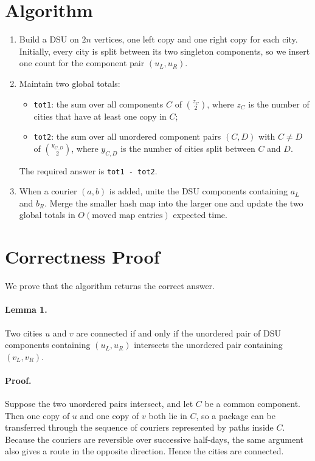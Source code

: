 \documentclass[11pt]{article}
\begin{document}
\section*{Algorithm}

\begin{enumerate}[leftmargin=*]
    \item Build a DSU on $2n$ vertices, one left copy and one right copy for each city.
    Initially, every city is split between its two singleton components, so we insert one count for the
    component pair $(u_L,u_R)$.
    \item Maintain two global totals:
    \begin{itemize}[leftmargin=*]
        \item \texttt{tot1}: the sum over all components $C$ of
        $\binom{z_C}{2}$, where $z_C$ is the number of cities that have at least one copy in $C$;
        \item \texttt{tot2}: the sum over all unordered component pairs $(C,D)$ with $C \ne D$ of
        $\binom{y_{C,D}}{2}$, where $y_{C,D}$ is the number of cities split between $C$ and $D$.
    \end{itemize}
    The required answer is \texttt{tot1 - tot2}.
    \item When a courier $(a,b)$ is added, unite the DSU components containing $a_L$ and $b_R$.
    Merge the smaller hash map into the larger one and update the two global totals in $O(\text{moved map
    entries})$ expected time.
\end{enumerate}

\section*{Correctness Proof}

We prove that the algorithm returns the correct answer.

\paragraph{Lemma 1.}
Two cities $u$ and $v$ are connected if and only if the unordered pair of DSU components containing
$(u_L,u_R)$ intersects the unordered pair containing $(v_L,v_R)$.

\paragraph{Proof.}
Suppose the two unordered pairs intersect, and let $C$ be a common component.
Then one copy of $u$ and one copy of $v$ both lie in $C$, so a package can be transferred through the
sequence of couriers represented by paths inside $C$.
Because the couriers are reversible over successive half-days, the same argument also gives a route in the
opposite direction. Hence the cities are connected.
\end{document}
